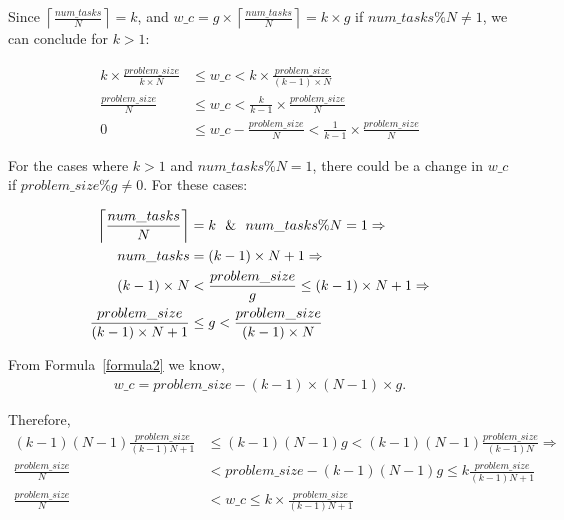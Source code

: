Since $\left \lceil{\frac{num\_{tasks}}{N}}\right \rceil=k$, and $w\_c={g\times\left \lceil{\frac{num\_{tasks}}{N}}\right \rceil}={k\times{g}}$ if $num\_{tasks}\%{N}\neq{1}$, we can conclude for $k>1$:

\begin{equation}\label{formula11}
\begin{aligned}
k\times{\frac{problem\_{size}}{k\times{N}}}&\leq{w\_c}<{k\times{\frac{problem\_{size}}{(k-1)\times{N}}}}\\
\frac{problem\_{size}}{{N}}&\leq{w\_c}<{\frac{k}{k-1}\times{\frac{problem\_{size}}{N}}}\\
0&\leq{w\_c-\frac{problem\_{size}}{N}}<\frac{1}{k-1}\times{\frac{problem\_{size}}{N}}
\end{aligned}
\end{equation}

For the cases where $k>1$ and $num\_{tasks}\%{N}={1}$, there could be a  change in $w\_c$ if $problem\_{size}\%{g}\neq{0}$. For these cases:


\begin{equation}\label{formula15}
\begin{aligned}
\left \lceil{\frac{num\_{tasks}}{N}}\right \rceil&=k \text{\:\:\:}\&\text{\:\:\:} num\_{tasks}\%{N}={1}\Rightarrow\\
num\_{tasks}&=(k-1)\times{N}+1\Rightarrow\\
(k-1)\times{N}&<{\frac{problem\_{size}}{g}}\leq(k-1)\times{N}+1\Rightarrow\\
\frac{problem\_{size}}{(k-1)\times{N}+1}&\leq{g}<\frac{problem\_{size}}{(k-1)\times{N}}
\end{aligned}
\end{equation}

From Formula~\ref{formula2} we know,
\begin{equation}\label{formula17}
\begin{aligned}
w\_c={problem\_{size}}-(k-1)\times(N-1)\times{g}.
\end{aligned}
\end{equation}

Therefore,
\begin{equation}\label{formula18}
\begin{aligned}
(k-1)(N-1)\frac{problem\_{size}}{(k-1){N}+1}&\leq{(k-1)(N-1){g}}<(k-1)(N-1)\frac{problem\_{size}}{(k-1){N}}\Rightarrow\\
{\frac{problem\_{size}}{N}}&<{problem\_{size}-{(k-1)(N-1){g}}}\leq{k\frac{problem\_{size}}{(k-1){N}+1}}\\
{\frac{problem\_{size}}{N}}&<{w\_{c}}\leq{k\times\frac{problem\_{size}}{(k-1){N}+1}}
\end{aligned}
\end{equation}

